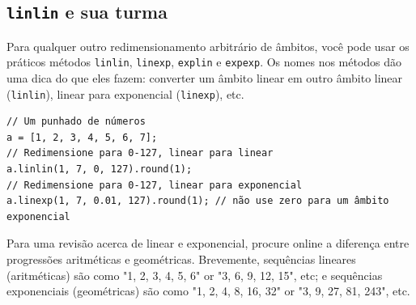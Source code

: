 \subsection{\texttt{linlin} e sua turma}

Para qualquer outro redimensionamento arbitrário de âmbitos, você pode usar os práticos métodos \texttt{linlin}, \texttt{linexp}, \texttt{explin} e \texttt{expexp}. Os nomes nos métodos dão uma dica do que eles fazem: converter um âmbito linear em outro âmbito linear (\texttt{linlin}), linear para exponencial (\texttt{linexp}), etc.

\begin{lstlisting}[style=SuperCollider-IDE, basicstyle=\scttfamily\footnotesize]
// Um punhado de números
a = [1, 2, 3, 4, 5, 6, 7];
// Redimensione para 0-127, linear para linear
a.linlin(1, 7, 0, 127).round(1);
// Redimensione para 0-127, linear para exponencial
a.linexp(1, 7, 0.01, 127).round(1); // não use zero para um âmbito exponencial
\end{lstlisting}

Para uma revisão acerca de linear e exponencial, procure online a diferença entre progressões aritméticas e geométricas. Brevemente, sequências lineares (aritméticas) são como "1, 2, 3, 4, 5, 6" or "3, 6, 9, 12, 15", etc; e sequências exponenciais (geométricas) são como "1, 2, 4, 8, 16, 32" or "3, 9, 27, 81, 243", etc.



